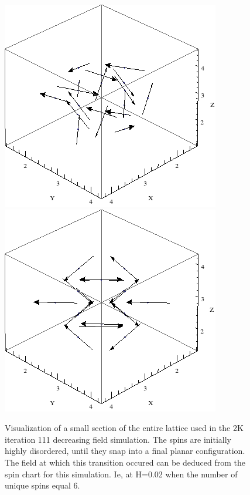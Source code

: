 \documentclass{article}
\begin{document}
\begin{figure}[ht]
\centering
\includegraphics[scale=0.7]{111_2000/1Sect005to000R.png}
\includegraphics[scale=0.7]{111_2000/2Sect005to000R.png}
\caption{Visualization of a small section of the entire lattice used in the 2K iteration 111 decreasing field simulation. The spins are initially
highly disordered, until they snap into a final planar configuration. The field at which this transition occured
can be deduced from the spin chart for this simulation. Ie, at H=0.02 when the number of unique spins equal 6.}
\end{figure}
\clearpage
\end{document}
